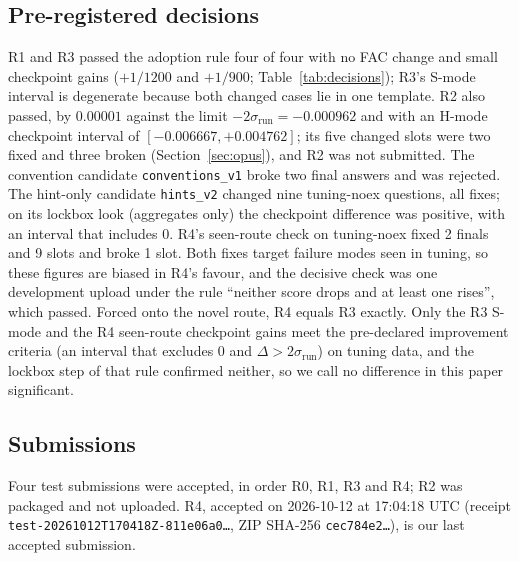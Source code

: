 \documentclass[conference]{IEEEtran}
\newcommand{\id}[1]{\texttt{#1}}
\begin{document}
\subsection{Pre-registered decisions}\label{sec:decisions}
R1 and R3 passed the adoption rule four of four with no FAC change and small checkpoint gains ($+1/1200$ and $+1/900$; Table~\ref{tab:decisions}); R3's S-mode interval is degenerate because both changed cases lie in one template. R2 also passed, by $0.00001$ against the limit $-2\sigma_{\mathrm{run}}=-0.000962$ and with an H-mode checkpoint interval of $[-0.006667,+0.004762]$; its five changed slots were two fixed and three broken (Section~\ref{sec:opus}), and R2 was not submitted. The convention candidate \id{conventions\_v1} broke two final answers and was rejected. The hint-only candidate \id{hints\_v2} changed nine tuning-noex questions, all fixes; on its lockbox look (aggregates only) the checkpoint difference was positive, with an interval that includes 0. R4's seen-route check on tuning-noex fixed 2 finals and 9 slots and broke 1 slot. Both fixes target failure modes seen in tuning, so these figures are biased in R4's favour, and the decisive check was one development upload under the rule ``neither score drops and at least one rises'', which passed. Forced onto the novel route, R4 equals R3 exactly. Only the R3 S-mode and the R4 seen-route checkpoint gains meet the pre-declared improvement criteria (an interval that excludes 0 and $\Delta>2\sigma_{\mathrm{run}}$) on tuning data, and the lockbox step of that rule confirmed neither, so we call no difference in this paper significant.

\subsection{Submissions}
Four test submissions were accepted, in order R0, R1, R3 and R4; R2 was packaged and not uploaded. R4, accepted on 2026-10-12 at 17:04:18 UTC (receipt \id{test-20261012T170418Z-811e06a0\ldots}, ZIP SHA-256 \id{cec784e2\ldots}), is our last accepted submission.
\end{document}
